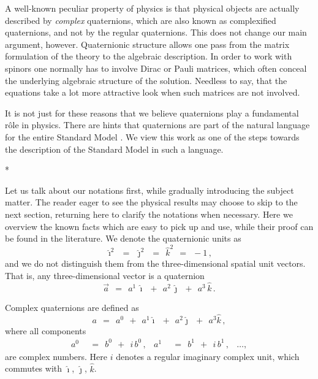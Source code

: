 \documentclass[epsfig,12pt]{article}
\newcommand{\ii}{\hat\imath}
\newcommand{\jj}{\hat\jmath}
\newcommand{\kk}{\hat k}
\begin{document}
	A well-known peculiar property of physics is that physical objects are actually described by \emph{complex} quaternions,
	which are also known as complexified quaternions, and not by the regular quaternions.
	This does not change our main argument, however.
	Quaternionic structure allows one pass from the matrix formulation of the theory to the algebraic description.
	In order to work with spinors one normally has to involve Dirac or Pauli matrices, which often conceal
	the underlying algebraic structure of the solution.
	Needless to say, that the equations take a lot more attractive look when such matrices are not involved.

	It is not just for these reasons that we believe quaternions play a fundamental r\^ole in physics.
	There are hints that quaternions are part of the natural language for the entire Standard Model \cite{}.
	We view this work as one of the steps towards the description of the Standard Model in
	such a language.


\vskip 0.8cm
\centerline{*\qquad\qquad\qquad*\qquad\qquad\qquad*}
\vskip 0.6cm


	Let us talk about our notations first, while gradually introducing the subject matter.
	The reader eager to see the physical results may choose to skip to the next section, returning here
	to clarify the notations when necessary.
	Here we overview the known facts which are easy to pick up and use, while their proof can be found in the literature.
	We denote the quaternionic units as
\begin{equation}
	\ii^2	~~=~~	\jj^2	~~=~~	\kk^2	~~=~~	-1\,,
\end{equation}
	and we do not distinguish them from the three-dimensional spatial unit vectors.
	That is, any three-dimensional vector is a quaternion
\begin{equation}
	\vec a	~~=~~	a^1\, \ii  ~~+~~  a^2\, \jj  ~~+~~  a^3\, \kk\,.
\end{equation}

	Complex quaternions are defined as
\begin{equation}
\label{cq}
	a	~~=~~	a^0  ~~+~~  a^1 \ii  ~~+~~  a^2 \jj  ~~+~~  a^3 \kk\,,
\end{equation}
	where all components
\begin{align}
	a^0	& ~~=~~	b^0  ~~+~~  i\,b^0\,,
	&
	a^1	& ~~=~~ b^1  ~~+~~  i\,b^1\,,
	&
	\dots,
\end{align}
	are complex numbers.
	Here $ i $ denotes a regular imaginary complex unit, which commutes with $ \ii $, $ \jj $, $ \kk $.
\end{document}
